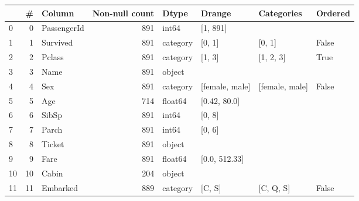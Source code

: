 \documentclass[preview]{standalone}
\begin{document}
    \begin{tabular}{lrlrllll}
\toprule
{} &   \# &       Column &  Non-null count &     Dtype &          Drange &      Categories & Ordered \\
\midrule
0  &   0 &  PassengerId &             891 &     int64 &        [1, 891] &                 &         \\
1  &   1 &     Survived &             891 &  category &          [0, 1] &          [0, 1] &   False \\
2  &   2 &       Pclass &             891 &  category &          [1, 3] &       [1, 2, 3] &    True \\
3  &   3 &         Name &             891 &    object &                 &                 &         \\
4  &   4 &          Sex &             891 &  category &  [female, male] &  [female, male] &   False \\
5  &   5 &          Age &             714 &   float64 &    [0.42, 80.0] &                 &         \\
6  &   6 &        SibSp &             891 &     int64 &          [0, 8] &                 &         \\
7  &   7 &        Parch &             891 &     int64 &          [0, 6] &                 &         \\
8  &   8 &       Ticket &             891 &    object &                 &                 &         \\
9  &   9 &         Fare &             891 &   float64 &   [0.0, 512.33] &                 &         \\
10 &  10 &        Cabin &             204 &    object &                 &                 &         \\
11 &  11 &     Embarked &             889 &  category &          [C, S] &       [C, Q, S] &   False \\
\bottomrule
\end{tabular}

    
\end{document}
